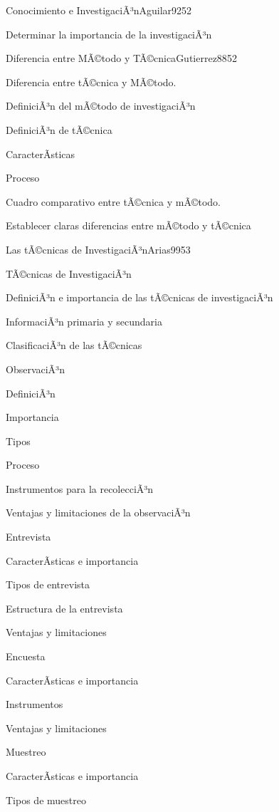 \begin{syllabus}
\begin{unit}{Conocimiento e InvestigaciÃ³n}{Aguilar92}{5}{2}
   \begin{unitgoals}
      \item Determinar la importancia de la investigaciÃ³n
   \end{unitgoals}
\end{unit}

\begin{unit}{Diferencia entre MÃ©todo y TÃ©cnica}{Gutierrez88}{5}{2}
   \begin{topics}
      \item Diferencia entre tÃ©cnica y MÃ©todo.
	\item DefiniciÃ³n del mÃ©todo de investigaciÃ³n
	\item DefiniciÃ³n de tÃ©cnica
	\item CaracterÃ­sticas
	\item Proceso
	\item Cuadro comparativo entre tÃ©cnica y mÃ©todo.
   \end{topics}

   \begin{unitgoals}
      \item Establecer claras diferencias entre mÃ©todo y tÃ©cnica
   \end{unitgoals}
\end{unit}

\begin{unit}{Las tÃ©cnicas de InvestigaciÃ³n}{Arias99}{5}{3}
   \begin{topics}
      \item TÃ©cnicas de InvestigaciÃ³n
	\item DefiniciÃ³n e importancia de las tÃ©cnicas de investigaciÃ³n
	\item InformaciÃ³n primaria y secundaria
	\item ClasificaciÃ³n de las tÃ©cnicas
	\item ObservaciÃ³n
	\item DefiniciÃ³n
	\item Importancia
	\item Tipos
	\item Proceso
	\item Instrumentos para la recolecciÃ³n 
	\item Ventajas y limitaciones de la observaciÃ³n
	\item Entrevista
	\item CaracterÃ­sticas e importancia
	\item Tipos de entrevista
	\item Estructura de la entrevista
	\item Ventajas y limitaciones
	\item Encuesta
	\item CaracterÃ­sticas e importancia
	\item Instrumentos
	\item Ventajas y limitaciones
	\item Muestreo
	\item CaracterÃ­sticas e importancia
	\item Tipos de muestreo
   \end{topics}


\end{unit}
\end{syllabus}
